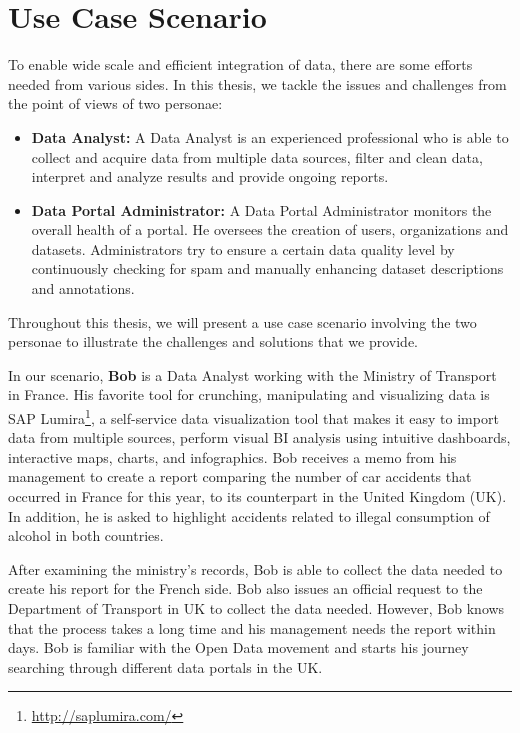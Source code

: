 \section{Use Case Scenario}\label{section:scenario}

To enable wide scale and efficient integration of data, there are some efforts needed from various sides. In this thesis, we tackle the issues and challenges from the point of views of two personae:

\begin{itemize}
	\item \textbf{Data Analyst:} A Data Analyst is an experienced professional who is able to collect and acquire data from multiple data sources, filter and clean data, interpret and analyze results and provide ongoing reports.
	\item \textbf{Data Portal Administrator:} A Data Portal Administrator monitors the overall health of a portal. He oversees the creation of users, organizations and datasets. Administrators try to ensure a certain data quality level by continuously checking for spam and manually enhancing dataset descriptions and annotations.
\end{itemize}

Throughout this thesis, we will present a use case scenario involving the two personae to illustrate the challenges and solutions that we provide.

In our scenario, \textbf{Bob} is a Data Analyst working with the Ministry of Transport in France. His favorite tool for crunching, manipulating and visualizing data is SAP Lumira\footnote{\url{http://saplumira.com/}}, a self-service data visualization tool that makes it easy to import data from multiple sources, perform visual BI analysis using intuitive dashboards, interactive maps, charts, and infographics. Bob receives a memo from his management to create a report comparing the number of car accidents that occurred in France for this year, to its counterpart in the United Kingdom (UK). In addition, he is asked to highlight accidents related to illegal consumption of alcohol in both countries.

After examining the ministry's records, Bob is able to collect the data needed to create his report for the French side. Bob also issues an official request to the Department of Transport in UK to collect the data needed. However, Bob knows that the process takes a long time and his management needs the report within days. Bob is familiar with the Open Data movement and starts his journey searching through different data portals in the UK.

